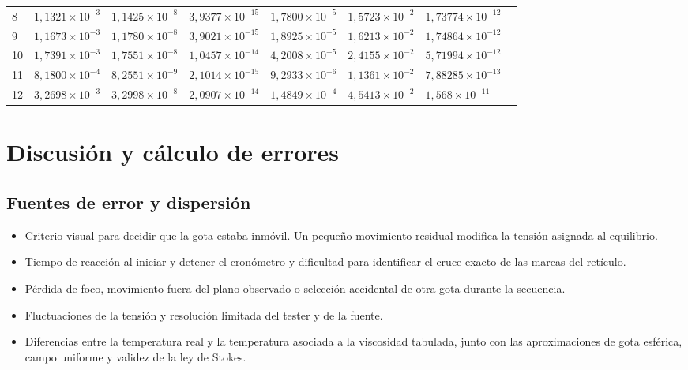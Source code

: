 \documentclass{article}
\begin{document}
\begin{table}[H]
\begin{tabular}{@{}C{0.8cm}C{1.9cm}C{1.7cm}C{1.9cm}C{1.9cm}C{1.8cm}C{1.9cm}C{0.8cm}@{}}
    8  & $1{,}1321\times10^{-3}$ & $1{,}1425\times10^{-8}$ & $3{,}9377\times10^{-15}$ & $1{,}7800\times10^{-5}$ & $1{,}5723\times10^{-2}$ & $1{,}73774\times10^{-12}$ \\
    9  & $1{,}1673\times10^{-3}$ & $1{,}1780\times10^{-8}$ & $3{,}9021\times10^{-15}$ & $1{,}8925\times10^{-5}$ & $1{,}6213\times10^{-2}$ & $1{,}74864\times10^{-12}$ \\
    10 & $1{,}7391\times10^{-3}$ & $1{,}7551\times10^{-8}$ & $1{,}0457\times10^{-14}$ & $4{,}2008\times10^{-5}$ & $2{,}4155\times10^{-2}$ & $5{,}71994\times10^{-12}$ \\
    11 & $8{,}1800\times10^{-4}$ & $8{,}2551\times10^{-9}$ & $2{,}1014\times10^{-15}$ & $9{,}2933\times10^{-6}$ & $1{,}1361\times10^{-2}$ & $7{,}88285\times10^{-13}$ \\
    12 & $3{,}2698\times10^{-3}$ & $3{,}2998\times10^{-8}$ & $2{,}0907\times10^{-14}$ & $1{,}4849\times10^{-4}$ & $4{,}5413\times10^{-2}$ & $1{,}568\times10^{-11}$ \\
    \bottomrule
\end{tabular}
\end{table}

\section{Discusión y cálculo de errores}

\subsection{Fuentes de error y dispersión}
\enlargethispage{\baselineskip}

\begin{itemize}
    \item Criterio visual para decidir que la gota estaba inmóvil. Un pequeño movimiento residual modifica la tensión asignada al equilibrio.
    \item Tiempo de reacción al iniciar y detener el cronómetro y dificultad para identificar el cruce exacto de las marcas del retículo.
    \item Pérdida de foco, movimiento fuera del plano observado o selección accidental de otra gota durante la secuencia.
    \item Fluctuaciones de la tensión y resolución limitada del tester y de la fuente.
    \item Diferencias entre la temperatura real y la temperatura asociada a la viscosidad tabulada, junto con las aproximaciones de gota esférica, campo uniforme y validez de la ley de Stokes.
\end{itemize}
\end{document}
